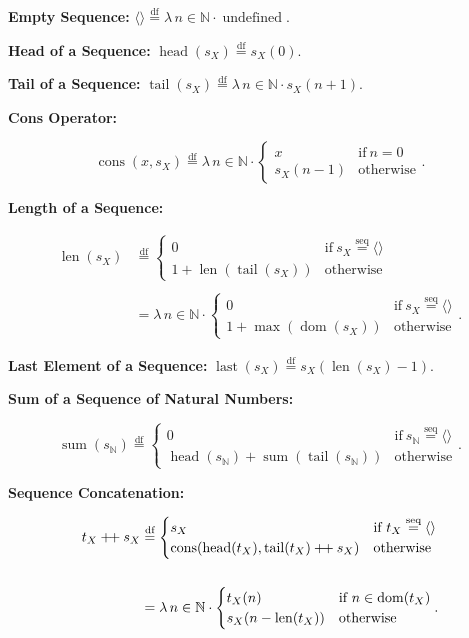 \documentclass[12pt]{article}
\newcommand{\dfeq}{\stackrel{\text{df}}{=}}
\newcommand{\seqeq}{\stackrel{\text{seq}}{=}}
\newcommand{\pp}{\mathbin{\mbox{{+}\nolinebreak\hspace{-.15em}{+}}}}
\DeclareMathOperator{\jdom}{dom}
\DeclareMathOperator{\jsum}{sum}
\DeclareMathOperator{\jundefined}{undefined}
\DeclareMathOperator{\jcons}{cons}
\DeclareMathOperator{\jhead}{head}
\DeclareMathOperator{\jlast}{last}
\DeclareMathOperator{\jtail}{tail}
\DeclareMathOperator{\jlen}{len}
\theoremstyle{plain}
\begin{document}
\textbf{Empty Sequence:} $\langle \rangle \dfeq \lambda\, n \in
\mathbb{N} \cdot \jundefined$.

\textbf{Head of a Sequence:} $\jhead(s_X) \dfeq s_X(0)$.

\textbf{Tail of a Sequence:} $\jtail(s_X) \dfeq \lambda\, n \in
\mathbb{N} \cdot s_X(n + 1)$.

\textbf{Cons Operator:}

$$
\jcons(x, s_X) \dfeq \lambda\, n \in \mathbb{N}
\cdot
\begin{cases}
    x          & \text{if}\ n = 0\\
    s_X(n - 1) & \text{otherwise}
\end{cases}.
$$

\textbf{Length of a Sequence:}

$$
\begin{aligned}
\jlen(s_X) &\dfeq
\begin{cases}
    0 & \text{if}\ s_X \seqeq \langle \rangle\\
    1 + \jlen(\jtail(s_X)) & \text{otherwise}
\end{cases}\\\\
&= \lambda\, n \in \mathbb{N} \cdot
\begin{cases}
    0 & \text{if}\ s_X \seqeq \langle \rangle\\
    1 + \max(\jdom(s_X)) & \text{otherwise}
\end{cases}.
\end{aligned}
$$

\textbf{Last Element of a Sequence:} $\jlast(s_X) \dfeq
s_X(\jlen(s_X) - 1)$.

\textbf{Sum of a Sequence of Natural Numbers:}

$$
\jsum(s_\mathbb{N}) \dfeq
\begin{cases}
    0 & \text{if}\ s_\mathbb{N} \seqeq \langle \rangle\\
    \jhead(s_\mathbb{N}) + \jsum(\jtail(s_\mathbb{N})) & \text{otherwise}
\end{cases}.
$$

\textbf{Sequence Concatenation:}

$$
\begin{aligned}
t_X \pp s_X &\dfeq
\begin{cases}
    s_X & \text{if}\ t_X \seqeq \langle \rangle\\
    \jcons(\jhead(t_X), \jtail(t_X) \pp s_X) & \text{otherwise}
\end{cases}\\\\
&= \lambda\, n \in \mathbb{N} \cdot
\begin{cases}
    t_X(n) & \text{if}\ n \in \jdom(t_X)\\
    s_X(n - \jlen(t_X)) & \text{otherwise}
\end{cases}.
\end{aligned}
$$
\end{document}
